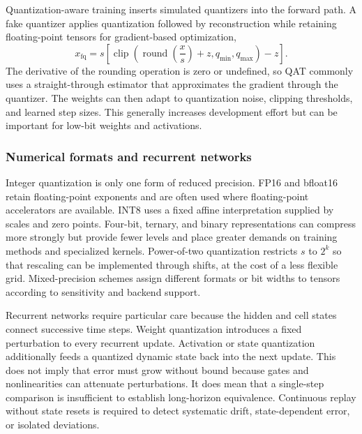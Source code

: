 \documentclass[
    a4paper,
    12pt,
    titlepage,
    bibliography=totoc,
    twoside=on,
    parskip=false,
    numbers=noenddot,
    cleardoublepage=empty,
    DIV=12,
    BCOR=12.0mm,
    headheight=36pt,
    headings=openright
]{scrreprt}
\begin{document}
Quantization-aware training inserts simulated quantizers into the forward path. A fake quantizer applies quantization followed by reconstruction while retaining floating-point tensors for gradient-based optimization,
\begin{equation}
    x_{\mathrm{fq}}
    =
    s\left[
    \operatorname{clip}\!\left(
    \operatorname{round}\!\left(\frac{x}{s}\right)+z,
    q_{\min},q_{\max}
    \right)-z
    \right].
    \label{eq:fundamental_fake_quantization}
\end{equation}
The derivative of the rounding operation is zero or undefined, so QAT commonly uses a straight-through estimator that approximates the gradient through the quantizer. The weights can then adapt to quantization noise, clipping thresholds, and learned step sizes. This generally increases development effort but can be important for low-bit weights and activations.\autocite{jacobQuantizationTrainingNeural2017,esserLearnedStepSize2020,nagelWhitePaperNeural2021}

\subsubsection{Numerical formats and recurrent networks}

Integer quantization is only one form of reduced precision. FP16 and bfloat16 retain floating-point exponents and are often used where floating-point accelerators are available. INT8 uses a fixed affine interpretation supplied by scales and zero points. Four-bit, ternary, and binary representations can compress more strongly but provide fewer levels and place greater demands on training methods and specialized kernels. Power-of-two quantization restricts $s$ to $2^k$ so that rescaling can be implemented through shifts, at the cost of a less flexible grid. Mixed-precision schemes assign different formats or bit widths to tensors according to sensitivity and backend support.\autocite{gholamiSurveyQuantizationMethods2021,nagelWhitePaperNeural2021}

Recurrent networks require particular care because the hidden and cell states connect successive time steps. Weight quantization introduces a fixed perturbation to every recurrent update. Activation or state quantization additionally feeds a quantized dynamic state back into the next update. This does not imply that error must grow without bound because gates and nonlinearities can attenuate perturbations. It does mean that a single-step comparison is insufficient to establish long-horizon equivalence. Continuous replay without state resets is required to detect systematic drift, state-dependent error, or isolated deviations.
\end{document}
